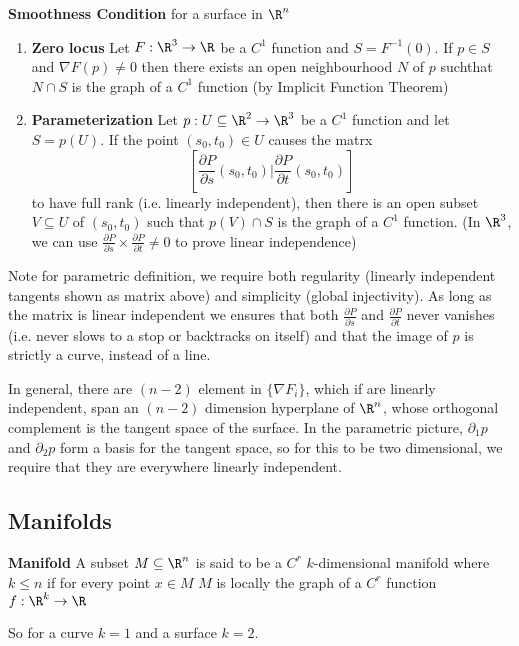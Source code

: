 \documentclass[11pt]{article}
\begin{document}
\begin{theorem}
  \textbf{Smoothness Condition} for a surface in $\R^n$
  \begin{enumerate}
    \item \textbf{Zero locus} Let $F:\R^3\to\R$ be a $C^1$ function and $S = F^{-1}(0)$. If $p\in S$ and $\nabla F(p)\neq 0$ then there exists an open neighbourhood $N$ of $p$ suchthat $N\cap S$ is the graph of a $C^1$ function (by Implicit Function Theorem)
    \item \textbf{Parameterization} Let $p: U\subseteq \R^2 \to \R^3$ be a $C^1$ function and let $S = p(U)$. If the point $(s_0, t_0)\in U$ causes the matrx
    \[
      \left[ \frac{\partial P}{\partial s}(s_0, t_0) | \frac{\partial P}{\partial t}(s_0, t_0) \right]
    \]
    to have full rank (i.e. linearly independent), then there is an open subset $V\subseteq U$ of $(s_0, t_0)$ such that $p(V) \cap S$ is the graph of a $C^1$ function. (In $\R^3$, we can use $\frac{\partial P}{\partial s}\times \frac{\partial P}{\partial t} \neq 0$ to prove linear independence)
  \end{enumerate}
  \begin{rem}
    Note for parametric definition, we require both regularity (linearly independent tangents shown as matrix above) and simplicity (global injectivity). As long as the matrix is linear independent we ensures that both $\frac{\partial P}{\partial s}$ and $\frac{\partial P}{\partial t}$ never vanishes (i.e. never slows to a stop or backtracks on itself) and that the image of $p$ is strictly a curve, instead of a line.
  \end{rem}
  \begin{note}
    In general, there are $(n-2)$ element in $\{ \nabla F_i \}$, which if are linearly independent, span an $(n-2)$ dimension hyperplane of $\R^n$, whose orthogonal complement is the tangent space of the surface. In the parametric picture, $\partial_1 p$ and $\partial_2 p$ form a basis for the tangent space, so for this to be two dimensional, we require that they are everywhere linearly independent.
  \end{note}
\end{theorem}

\subsection*{Manifolds}
\begin{defn*}
  \textbf{Manifold} A subset $M\subseteq \R^n$ is said to be a $C^r$ $k$-dimensional manifold where $k \leq n$ if for every point $x\in M$ $M$ is locally the graph of a $C^r$ function $f: \R^k \to \R$
  \begin{rem}
    So for a curve $k=1$ and a surface $k=2$.
  \end{rem}
\end{defn*}
\end{document}
